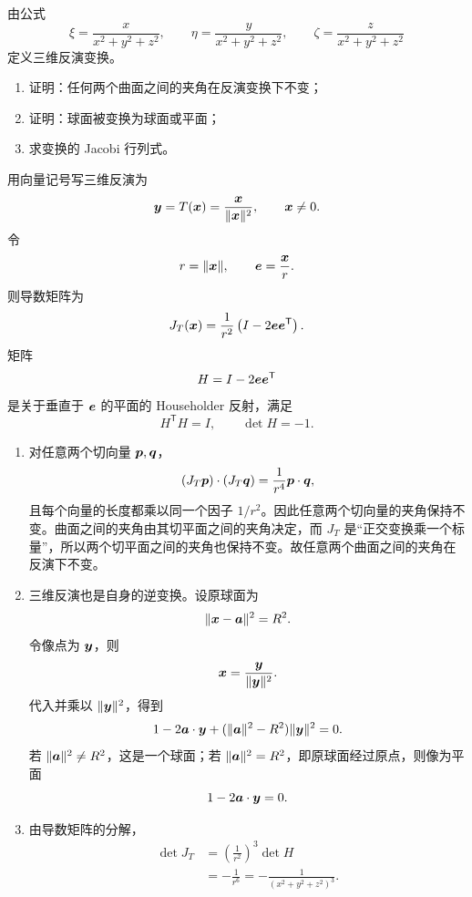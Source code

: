 \begin{xreferenceproblem}[8]
由公式
  \[
    \xi=\frac{x}{x^2+y^2+z^2},\qquad
    \eta=\frac{y}{x^2+y^2+z^2},\qquad
    \zeta=\frac{z}{x^2+y^2+z^2}
  \]
  定义三维反演变换。
  \begin{enumerate}[label=(\arabic*)]
    \item 证明：任何两个曲面之间的夹角在反演变换下不变；
    \item 证明：球面被变换为球面或平面；
    \item 求变换的 Jacobi 行列式。
  \end{enumerate}
\end{xreferenceproblem}
\begin{xsolution}
用向量记号写三维反演为
\[
  \bm{y}=T(\bm{x})=
  \frac{\bm{x}}{\lVert\bm{x}\rVert^2},
  \qquad \bm{x}\ne0.
\]
令
\[
  r=\lVert\bm{x}\rVert,
  \qquad
  \bm{e}=\frac{\bm{x}}r.
\]
则导数矩阵为
\[
  J_T(\bm{x})
  =\frac1{r^2}\left(I-2\bm{e}\bm{e}^{\mathsf T}\right).
\]
矩阵
\[
  H=I-2\bm{e}\bm{e}^{\mathsf T}
\]
是关于垂直于 $\bm{e}$ 的平面的 Householder 反射，满足
\[
  H^{\mathsf T}H=I,
  \qquad
  \det H=-1.
\]

\begin{enumerate}[label=(\arabic*)]
  \item 对任意两个切向量 $\bm{p},\bm{q}$，
  \[
    (J_T\bm{p})\cdot(J_T\bm{q})
    =\frac1{r^4}\bm{p}\cdot\bm{q},
  \]
  且每个向量的长度都乘以同一个因子 $1/r^2$。因此任意两个切向量的夹角保持不变。曲面之间的夹角由其切平面之间的夹角决定，而 $J_T$ 是“正交变换乘一个标量”，所以两个切平面之间的夹角也保持不变。故任意两个曲面之间的夹角在反演下不变。

  \item 三维反演也是自身的逆变换。设原球面为
  \[
    \lVert\bm{x}-\bm{a}\rVert^2=R^2.
  \]
  令像点为 $\bm{y}$，则
  \[
    \bm{x}=\frac{\bm{y}}{\lVert\bm{y}\rVert^2}.
  \]
  代入并乘以 $\lVert\bm{y}\rVert^2$，得到
  \[
    1-2\bm{a}\cdot\bm{y}
    +(\lVert\bm{a}\rVert^2-R^2)\lVert\bm{y}\rVert^2=0.
  \]
  若 $\lVert\bm{a}\rVert^2\ne R^2$，这是一个球面；若 $\lVert\bm{a}\rVert^2=R^2$，即原球面经过原点，则像为平面
  \[
    1-2\bm{a}\cdot\bm{y}=0.
  \]

  \item 由导数矩阵的分解，
  \[
  \begin{aligned}
    \det J_T
    &=\left(\frac1{r^2}\right)^3\det H\\
    &=-\frac1{r^6}
    =-\frac1{(x^2+y^2+z^2)^3}.
  \end{aligned}
  \]
\end{enumerate}
\end{xsolution}
